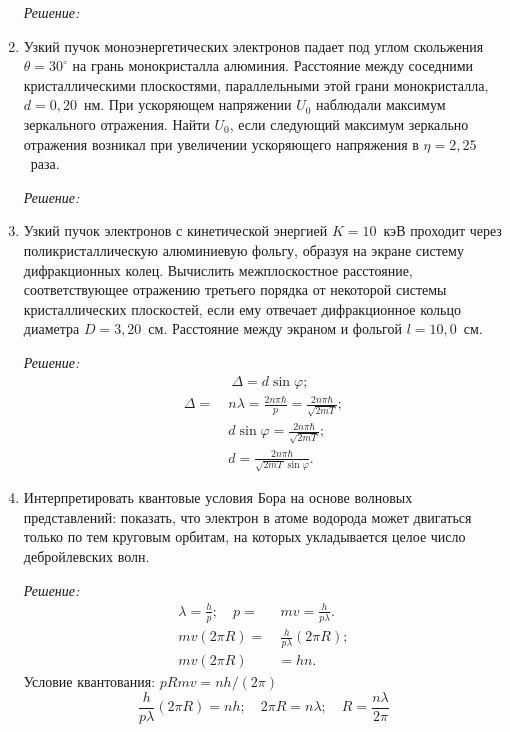 \begin{enumerate}
\emph{Решение:}

\newpage

\item Узкий пучок моноэнергетических электронов падает под углом скольжения
\( \theta = 30^\circ \) на грань монокристалла алюминия. Расстояние между
соседними кристаллическими плоскостями, параллельными этой грани монокристалла,
\( d = 0,\!20 \)~нм. При ускоряющем напряжении \( U_0 \) наблюдали максимум
зеркального отражения. Найти \( U_0 \), если следующий максимум зеркально
отражения возникал при увеличении ускоряющего напряжения в
\( \eta = 2,\!25 \)~раза.

\emph{Решение:}

\newpage

\item Узкий пучок электронов с кинетической энергией \( K = 10 \)~кэВ проходит
через поликристаллическую алюминиевую фольгу, образуя на экране систему
дифракционных колец. Вычислить межплоскостное расстояние, соответствующее
отражению третьего порядка от некоторой системы кристаллических плоскостей, если
ему отвечает дифракционное кольцо диаметра \( D = 3,\!20 \)~см. Расстояние между
экраном и фольгой \( l = 10,\!0 \)~см.

\emph{Решение:}
    \begin{align*}
        &\ \Delta = d\sin\varphi; \\
        \Delta =\ &n\lambda = \frac{2n\pi\hbar}{p} = \frac{2n\pi\hbar}{\sqrt{2mT}}; \\
        & d\sin\varphi = \frac{2n\pi\hbar}{\sqrt{2mT}}; \\
        & d = \frac{2n\pi\hbar}{\sqrt{2mT}\sin\varphi}.
    \end{align*}

\newpage

\item Интерпретировать квантовые условия Бора на основе волновых представлений:
показать, что электрон в атоме водорода может двигаться только по тем круговым
орбитам, на которых укладывается целое число дебройлевских волн.

\emph{Решение:}
    \begin{align*}
        \lambda = \frac{h}{p}; \quad p = &\ mv = \frac{h}{p\lambda}. \\
        mv(2\pi R) = &\ \frac{h}{p\lambda}(2\pi R); \\
        mv(2\pi R) & = hn.
    \end{align*}
    Условие квантования: \( pRmv = nh/(2\pi) \)
    \[
        \frac{h}{p\lambda}(2\pi R) = nh;\quad
        2\pi R = n\lambda;\quad
        R = \frac{n\lambda}{2\pi}
    \]


\end{enumerate}
